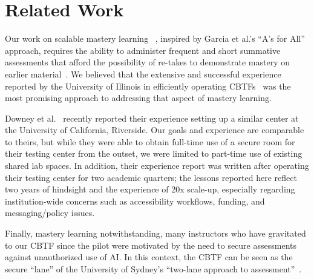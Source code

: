 \section{Related Work}

Our 
work on scalable mastery learning ~\cite{Bloom68}, inspired by
Garcia et al.'s ``A's for All''~\cite{garcia-asforall} approach,
requires
the ability to administer frequent and
short summative
assessments that afford the
possibility of re-takes to demonstrate mastery on earlier
material~\cite{secondchanceexams}.
We believed that the extensive and
successful experience reported by the University of Illinois in
efficiently operating
CBTFs~\cite{zilles-testing-less-trying} was the most promising
approach to addressing that aspect of mastery learning.

Downey et al.~\cite{downey-cbtf} recently reported their experience
setting up a similar center at the University of California,
Riverside.
Our goals and experience are comparable to theirs, but while they were
able to obtain full-time use of a secure room for their testing center
from the outset, we were limited to part-time use of existing
shared lab spaces.
In addition, their experience report was written after operating their
testing center for two academic quarters; the lessons reported here reflect two years of
hindsight and the experience of 20x scale-up, especially regarding
institution-wide concerns such as 
accessibility workflows, funding, and messaging/policy
issues.

Finally, mastery learning notwithstanding, many instructors who have
gravitated to our CBTF since the pilot were motivated 
by the need to secure assessments against unauthorized use
of AI.  In this context, the CBTF can be seen as the secure ``lane''
of the University of Sydney's ``two-lane approach to
assessment''~\cite{twolane}.
